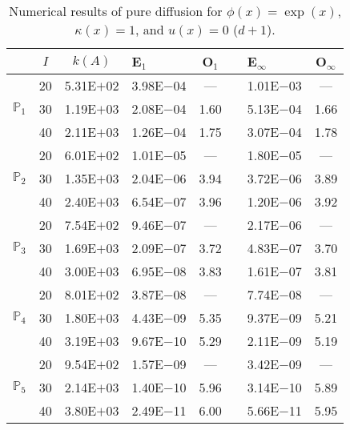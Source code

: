 \begin{table}[H]
\centering
\caption{Numerical results of pure diffusion for $\phi(x)=\exp(x)$, $\kappa(x)=1$, and $u(x)=0$ ($d+1$).}
\begin{tabular}{@{}l c c l c c l c@{}}
\toprule
 & $I$ & $k(A)$ & E$_1$ & O$_1$ && E$_{\infty}$ & O$_{\infty}$\\
\midrule
\multirow{3}{*}{$\mathbb{P}_{1}$}
 & 20 & 5.31E$+$02 & 3.98E$-$04 & --- && 1.01E$-$03 & ---\\
 & 30 & 1.19E$+$03 & 2.08E$-$04 & 1.60 && 5.13E$-$04 & 1.66\\
 & 40 & 2.11E$+$03 & 1.26E$-$04 & 1.75 && 3.07E$-$04 & 1.78\\
\midrule
\multirow{3}{*}{$\mathbb{P}_{2}$}
 & 20 & 6.01E$+$02 & 1.01E$-$05 & --- && 1.80E$-$05 & ---\\
 & 30 & 1.35E$+$03 & 2.04E$-$06 & 3.94 && 3.72E$-$06 & 3.89\\
 & 40 & 2.40E$+$03 & 6.54E$-$07 & 3.96 && 1.20E$-$06 & 3.92\\
\midrule
\multirow{3}{*}{$\mathbb{P}_{3}$}
 & 20 & 7.54E$+$02 & 9.46E$-$07 & --- && 2.17E$-$06 & ---\\
 & 30 & 1.69E$+$03 & 2.09E$-$07 & 3.72 && 4.83E$-$07 & 3.70\\
 & 40 & 3.00E$+$03 & 6.95E$-$08 & 3.83 && 1.61E$-$07 & 3.81\\
\midrule
\multirow{3}{*}{$\mathbb{P}_{4}$}
 & 20 & 8.01E$+$02 & 3.87E$-$08 & --- && 7.74E$-$08 & ---\\
 & 30 & 1.80E$+$03 & 4.43E$-$09 & 5.35 && 9.37E$-$09 & 5.21\\
 & 40 & 3.19E$+$03 & 9.67E$-$10 & 5.29 && 2.11E$-$09 & 5.19\\
\midrule
\multirow{3}{*}{$\mathbb{P}_{5}$}
 & 20 & 9.54E$+$02 & 1.57E$-$09 & --- && 3.42E$-$09 & ---\\
 & 30 & 2.14E$+$03 & 1.40E$-$10 & 5.96 && 3.14E$-$10 & 5.89\\
 & 40 & 3.80E$+$03 & 2.49E$-$11 & 6.00 && 5.66E$-$11 & 5.95\\
\bottomrule
\end{tabular}
\end{table}